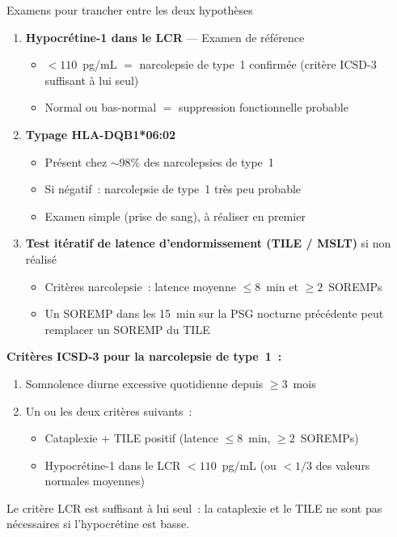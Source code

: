 \documentclass[11pt,a4paper]{article}
\begin{document}
\begin{mechanism}{Examens pour trancher entre les deux hypothèses}

\begin{enumerate}
    \item \textbf{Hypocrétine-1 dans le LCR} --- Examen de référence
    \begin{itemize}[nosep]
        \item $< 110$~pg/mL $=$ narcolepsie de type~1 confirmée (critère ICSD-3 suffisant à lui seul)
        \item Normal ou bas-normal $=$ suppression fonctionnelle probable
    \end{itemize}

    \item \textbf{Typage HLA-DQB1*06:02}
    \begin{itemize}[nosep]
        \item Présent chez $\sim$98\% des narcolepsies de type~1
        \item Si négatif~: narcolepsie de type~1 très peu probable
        \item Examen simple (prise de sang), à réaliser en premier
    \end{itemize}

    \item \textbf{Test itératif de latence d'endormissement (TILE / MSLT)} si non réalisé
    \begin{itemize}[nosep]
        \item Critères narcolepsie~: latence moyenne $\leq 8$~min et $\geq 2$~SOREMPs
        \item Un SOREMP dans les 15~min sur la PSG nocturne précédente peut remplacer un SOREMP du TILE
    \end{itemize}
\end{enumerate}

\textbf{Critères ICSD-3 pour la narcolepsie de type~1~:}
\begin{enumerate}[nosep]
    \item Somnolence diurne excessive quotidienne depuis $\geq 3$~mois
    \item Un ou les deux critères suivants~:
    \begin{itemize}[nosep]
        \item Cataplexie + TILE positif (latence $\leq 8$~min, $\geq 2$~SOREMPs)
        \item Hypocrétine-1 dans le LCR $< 110$~pg/mL (ou $< 1/3$ des valeurs normales moyennes)
    \end{itemize}
\end{enumerate}
Le critère LCR est suffisant à lui seul~: la cataplexie et le TILE ne sont pas nécessaires si l'hypocrétine est basse.
\end{mechanism}
\end{document}
